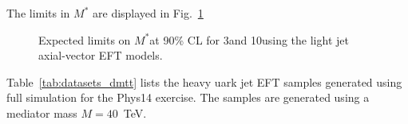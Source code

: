 The limits in $M^*$ are displayed in Fig.~\ref{fig:MJ_EFT_limit}

\begin{figure}[h]
  \centering
  \caption{\label{fig:MJ_EFT_limit} Expected limits on $M^*$at 90\% CL for 3\fbinv and 10\fbinv using the light jet axial-vector EFT models. }
\end{figure}



\clearpage


Table~\ref{tab:datasets_dmtt} lists the heavy uark jet EFT samples generated using full simulation for the Phys14 exercise. The samples are generated using a mediator mass $M=40$~TeV.

